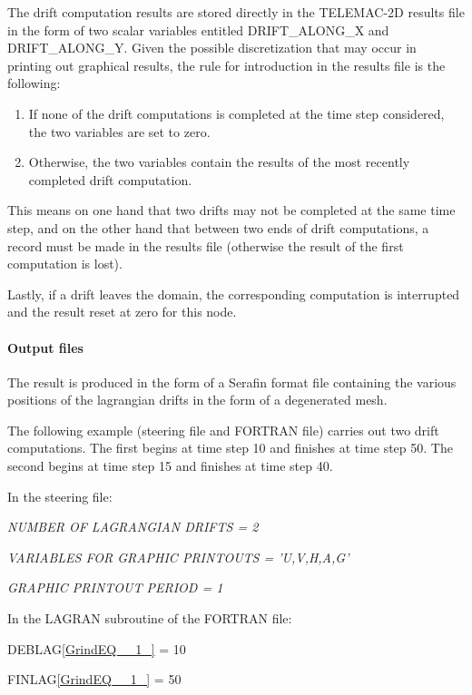 \documentclass{article} %
\begin{document}
 The drift computation results are stored directly in the TELEMAC-2D results file in the form of two scalar variables entitled DRIFT\_ALONG\_X and DRIFT\_ALONG\_Y. Given the possible discretization that may occur in printing out graphical results, the rule for introduction in the results file is the following:

\begin{enumerate}
\item  If none of the drift computations is completed at the time step considered, the two variables are set to zero.

\item  Otherwise, the two variables contain the results of the most recently completed drift computation.
\end{enumerate}

 This means on one hand that two drifts may not be completed at the same time step, and on the other hand that between two ends of drift computations, a record must be made in the results file (otherwise the result of the first computation is lost).

 Lastly, if a drift leaves the domain, the corresponding computation is interrupted and the result reset at zero for this node.


\paragraph{ Output files}

 The result is produced in the form of a Serafin format file containing the various positions of the lagrangian drifts in the form of a degenerated mesh.



  The following example (steering file and FORTRAN file) carries out two drift computations. The first begins at time step 10 and finishes at time step 50. The second begins at time step 15 and finishes at time step 40.

  In the steering file:

   \textit{NUMBER OF LAGRANGIAN DRIFTS   = 2}

\textit{   VARIABLES FOR GRAPHIC PRINTOUTS = 'U,V,H,A,G'}

\textit{   GRAPHIC PRINTOUT PERIOD = 1}

  In the LAGRAN subroutine of the FORTRAN file:

   DEBLAG\eqref{GrindEQ__1_} = 10

   FINLAG\eqref{GrindEQ__1_} = 50
\end{document}
